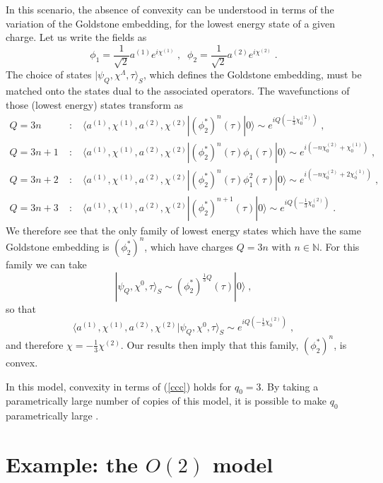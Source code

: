 \documentclass[11pt]{article}
\numberwithin{equation}{section}
\newcommand{\be}{\begin{equation}} \newcommand{\ee}{\end{equation}}
\newcommand{\bea}{\begin{eqnarray}}  \newcommand{\eea}{\end{eqnarray}}
\newcommand{\nn}{\nonumber}
\begin{document}
In this scenario, the absence of convexity can be understood in terms of the variation of the Goldstone embedding, for the lowest energy state of a given charge.
Let us write the fields as
\be
\phi_1 = \frac{1}{\sqrt{2}} a^{(1)} e^{i \chi^{(1)}} \;,\;\; \phi_2 = \frac{1}{\sqrt{2}} a^{(2)} e^{i \chi^{(2)}} \;.
\ee
The choice of states $| \psi_{Q}, \chi^{\Lambda}, \tau \rangle_S$, which defines the Goldstone embedding, must be matched onto the states dual to the associated operators. The wavefunctions of those (lowest energy) states transform as 
\bea
Q=3n \;&:&\; \langle a^{(1)},\chi^{(1)},a^{(2)},\chi^{(2)}|\left(\phi_2^*\right)^n(\tau) | 0 \rangle \sim e^{i Q \left(-\frac13 \chi^{(2)}_0 \right) }\;, \nn \\
Q=3n+1 \;&:&\; \langle a^{(1)},\chi^{(1)},a^{(2)},\chi^{(2)}|\left(\phi_2^*\right)^n(\tau) \phi_1(\tau) | 0 \rangle \sim e^{i \left(-n \chi^{(2)}_0 + \chi^{(1)}_0\right) } \;, \nn \\
Q=3n+2 \;&:&\; \langle a^{(1)},\chi^{(1)},a^{(2)},\chi^{(2)}|\left(\phi_2^*\right)^n(\tau) \phi_1^2(\tau) | 0 \rangle \sim e^{i  \left(-n \chi^{(2)}_0 + 2 \chi^{(1)}_0 \right) }\;, \nn \\
Q=3n+3 \;&:&\; \langle a^{(1)},\chi^{(1)},a^{(2)},\chi^{(2)}|\left(\phi_2^*\right)^{n+1}(\tau) | 0 \rangle \sim e^{i Q \left(-\frac13 \chi^{(2)}_0 \right) }\;.
\eea
We therefore see that the only family of lowest energy states which have the same Goldstone embedding is $\left(\phi_2^*\right)^n$, which have charges $Q=3n$ with $n \in \mathbb{N}$. For this family we can take 
\be
| \psi_{Q}, \chi^0, \tau \rangle_S \sim \left(\phi_2^*\right)^{\frac13 Q}(\tau) | 0 \rangle \;,
\ee
so that
\be
\langle a^{(1)},\chi^{(1)},a^{(2)},\chi^{(2)} | \psi_{Q}, \chi^0, \tau \rangle_S \sim e^{i Q \left(-\frac13 \chi^{(2)}_0 \right) }\;,
\label{2ndemb}
\ee
and therefore $\chi = -\frac13 \chi^{(2)}$.
Our results then imply that this family, $\left(\phi_2^*\right)^n$, is convex. 

In this model, convexity in terms of (\ref{ccc}) holds for $q_0=3$. By taking a parametrically large number of copies of this model, it is possible to make $q_0$ parametrically large \cite{Sharon:2023drx}.


\section{Example: the $O(2)$ model}
\label{sec:to2m}
\end{document}
